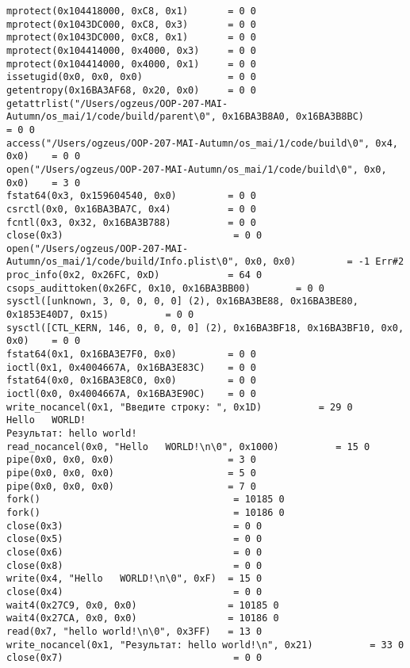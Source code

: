 \begin{lstlisting}
mprotect(0x104418000, 0xC8, 0x1)       = 0 0
mprotect(0x1043DC000, 0xC8, 0x3)       = 0 0
mprotect(0x1043DC000, 0xC8, 0x1)       = 0 0
mprotect(0x104414000, 0x4000, 0x3)     = 0 0
mprotect(0x104414000, 0x4000, 0x1)     = 0 0
issetugid(0x0, 0x0, 0x0)               = 0 0
getentropy(0x16BA3AF68, 0x20, 0x0)     = 0 0
getattrlist("/Users/ogzeus/OOP-207-MAI-Autumn/os_mai/1/code/build/parent\0", 0x16BA3B8A0, 0x16BA3B8BC)          = 0 0
access("/Users/ogzeus/OOP-207-MAI-Autumn/os_mai/1/code/build\0", 0x4, 0x0)    = 0 0
open("/Users/ogzeus/OOP-207-MAI-Autumn/os_mai/1/code/build\0", 0x0, 0x0)    = 3 0
fstat64(0x3, 0x159604540, 0x0)         = 0 0
csrctl(0x0, 0x16BA3BA7C, 0x4)          = 0 0
fcntl(0x3, 0x32, 0x16BA3B788)          = 0 0
close(0x3)                              = 0 0
open("/Users/ogzeus/OOP-207-MAI-Autumn/os_mai/1/code/build/Info.plist\0", 0x0, 0x0)         = -1 Err#2
proc_info(0x2, 0x26FC, 0xD)            = 64 0
csops_audittoken(0x26FC, 0x10, 0x16BA3BB00)        = 0 0
sysctl([unknown, 3, 0, 0, 0, 0] (2), 0x16BA3BE88, 0x16BA3BE80, 0x1853E40D7, 0x15)          = 0 0
sysctl([CTL_KERN, 146, 0, 0, 0, 0] (2), 0x16BA3BF18, 0x16BA3BF10, 0x0, 0x0)    = 0 0
fstat64(0x1, 0x16BA3E7F0, 0x0)         = 0 0
ioctl(0x1, 0x4004667A, 0x16BA3E83C)    = 0 0
fstat64(0x0, 0x16BA3E8C0, 0x0)         = 0 0
ioctl(0x0, 0x4004667A, 0x16BA3E90C)    = 0 0
write_nocancel(0x1, "Введите строку: ", 0x1D)          = 29 0
Hello   WORLD!
Результат: hello world!
read_nocancel(0x0, "Hello   WORLD!\n\0", 0x1000)          = 15 0
pipe(0x0, 0x0, 0x0)                    = 3 0
pipe(0x0, 0x0, 0x0)                    = 5 0
pipe(0x0, 0x0, 0x0)                    = 7 0
fork()                                  = 10185 0
fork()                                  = 10186 0
close(0x3)                              = 0 0
close(0x5)                              = 0 0
close(0x6)                              = 0 0
close(0x8)                              = 0 0
write(0x4, "Hello   WORLD!\n\0", 0xF)  = 15 0
close(0x4)                              = 0 0
wait4(0x27C9, 0x0, 0x0)                = 10185 0
wait4(0x27CA, 0x0, 0x0)                = 10186 0
read(0x7, "hello world!\n\0", 0x3FF)   = 13 0
write_nocancel(0x1, "Результат: hello world!\n", 0x21)          = 33 0
close(0x7)                              = 0 0
\end{lstlisting}